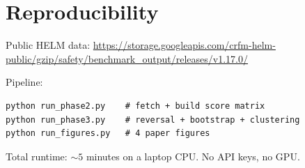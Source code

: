 \documentclass[10pt]{article}
\begin{document}



\appendix
\section{Reproducibility}

Public HELM data:
\url{https://storage.googleapis.com/crfm-helm-public/gzip/safety/benchmark_output/releases/v1.17.0/}

Pipeline:
\begin{verbatim}
python run_phase2.py    # fetch + build score matrix
python run_phase3.py    # reversal + bootstrap + clustering
python run_figures.py   # 4 paper figures
\end{verbatim}

Total runtime: $\sim 5$ minutes on a laptop CPU. No API keys, no GPU.
\end{document}
